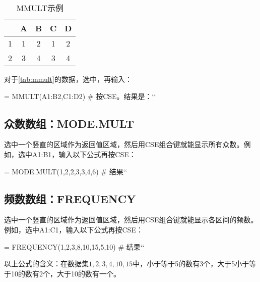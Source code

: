 \begin{table}[!hbt]
    \centering
    \caption{MMULT示例}\label{tab:mmult}
    \begin{tabular}{c|cccc}
    \hline
      & A & B & C & D \\
    \hline
    1 & 1 & 2 & 1 & 2 \\
    2 & 3 & 4 & 3 & 4 \\
    \hline
    \end{tabular}
\end{table}

对于\autoref{tab:mmult}的数据，选中，再输入：
\begin{excode}
= MMULT(A1:B2,C1:D2)  # 按CSE。结果是：``
\end{excode}

\subsection{众数数组：MODE.MULT}
\label{fun:mode.mult}
选中一个竖直的区域作为返回值区域，然后用CSE组合键就能显示所有众数。例如，选中A1:B1，输入以下公式再按CSE：
\begin{excode}
= MODE.MULT({1,2,2,3,3,4,6})  # 结果``
\end{excode}

\subsection{频数数组：FREQUENCY}
\label{fun:frequency}
选中一个竖直的区域作为返回值区域，然后用CSE组合键就能显示各区间的频数。例如，选中A1:C1，输入以下公式再按CSE：
\begin{excode}
= FREQUENCY({1,2,3,8,10,15},{5,10})  # 结果``
\end{excode}

以上公式的含义：在数据集$1,2,3,4,10,15$中，小于等于5的数有3个，大于5小于等于10的数有2个，大于10的数有一个。

